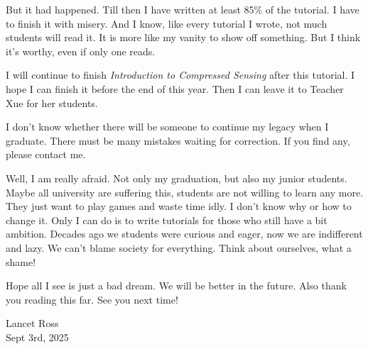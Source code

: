 \documentclass[12pt]{ctexart}
\begin{document}
But it had happened. Till then I have written at least 85\% of the tutorial. I have to finish
it with misery. And I know, like every tutorial I wrote, not much students will read it.
It is more like my vanity to show off something. But I think it's worthy, even if only one
reads.

I will continue to finish \textit{Introduction to Compressed Sensing} after this tutorial.
I hope I can finish it before the end of this year. Then I can leave it to Teacher Xue for
her students.

I don't know whether there will be someone to continue my legacy when I graduate. There must
be many mistakes waiting for correction. If you find any, please contact me.

Well, I am really afraid. Not only my graduation, but also my junior students. Maybe all
university are suffering this, students are not willing to learn any more. They just want to
play games and waste time idly. I don't know why or how to change it. Only I can do is to
write tutorials for those who still have a bit ambition. Decades ago we students were
curious and eager, now we are indifferent and lazy. We can't blame society for everything.
Think about ourselves, what a shame!

Hope all I see is just a bad dream. We will be better in the future. Also thank you reading
this far. See you next time!

\begin{flushright}
  Lancet Ross \\
  Sept 3rd, 2025
\end{flushright}
\end{document}
